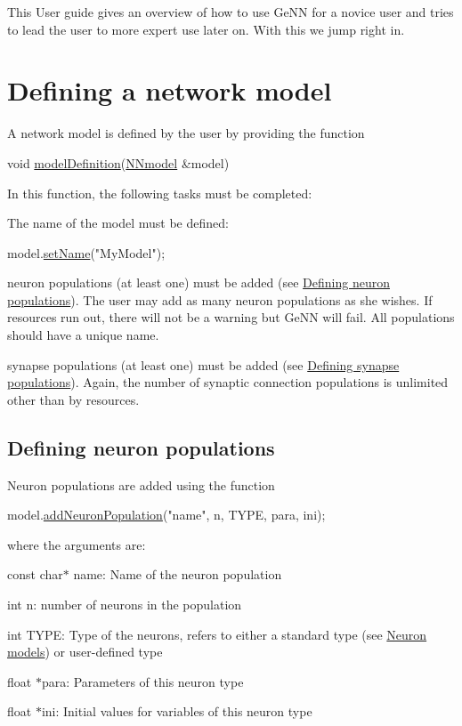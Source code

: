 This User guide gives an overview of how to use Ge\+N\+N for a novice user and tries to lead the user to more expert use later on. With this we jump right in.\hypertarget{UserManual_sec_sect1}{}\section{Defining a network model}\label{UserManual_sec_sect1}
A network model is defined by the user by providing the function 
\begin{DoxyCode}
\textcolor{keywordtype}{void} \hyperlink{tmp_2model_2MBody__userdef_8cc_a9aeaa0a22980484b2c472564fc9f686e}{modelDefinition}(\hyperlink{classNNmodel}{NNmodel} &model) 
\end{DoxyCode}
 In this function, the following tasks must be completed\+:
\begin{DoxyItemize}
\item The name of the model must be defined\+: 
\begin{DoxyCode}
model.\hyperlink{classNNmodel_a757eff2a5877688e6e5492726df035ee}{setName}(\textcolor{stringliteral}{"MyModel"});
\end{DoxyCode}

\item neuron populations (at least one) must be added (see \hyperlink{UserManual_sec_subsect11}{Defining neuron populations}). The user may add as many neuron populations as she wishes. If resources run out, there will not be a warning but Ge\+N\+N will fail. All populations should have a unique name.
\item synapse populations (at least one) must be added (see \hyperlink{UserManual_sec_subsect12}{Defining synapse populations}). Again, the number of synaptic connection populations is unlimited other than by resources.
\end{DoxyItemize}\hypertarget{UserManual_sec_subsect11}{}\subsection{Defining neuron populations}\label{UserManual_sec_subsect11}
Neuron populations are added using the function 
\begin{DoxyCode}
model.\hyperlink{classNNmodel_a24532739d3ae98da3e00a9fe5aadd54e}{addNeuronPopulation}(\textcolor{stringliteral}{"name"}, n, TYPE, para, ini);
\end{DoxyCode}
 where the arguments are\+: \begin{DoxyItemize}
\item {\ttfamily const} {\ttfamily char$\ast$} name\+: Name of the neuron population \item {\ttfamily int} n\+: number of neurons in the population \item {\ttfamily int} T\+Y\+P\+E\+: Type of the neurons, refers to either a standard type (see \hyperlink{UserManual_sec_sect2}{Neuron models}) or user-\/defined type \item {\ttfamily float} $\ast$para\+: Parameters of this neuron type \item {\ttfamily float} $\ast$ini\+: Initial values for variables of this neuron type\end{DoxyItemize}
